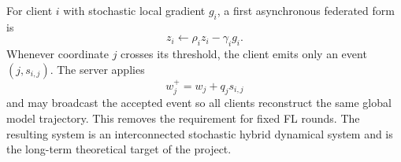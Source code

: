 For client $i$ with stochastic local gradient $g_i$, a first asynchronous federated form is
\begin{equation}
  z_i\leftarrow\rho_i z_i-\gamma_i g_i.
\end{equation}
Whenever coordinate $j$ crosses its threshold, the client emits only an event $(j,s_{i,j})$. The server applies
\begin{equation}
  w_j^+=w_j+q_j s_{i,j}
\end{equation}
and may broadcast the accepted event so all clients reconstruct the same global model trajectory. This removes the requirement for fixed FL rounds. The resulting system is an interconnected stochastic hybrid dynamical system and is the long-term theoretical target of the project.
